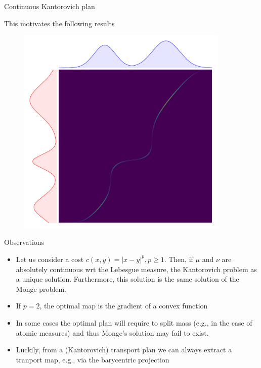 \documentclass[pdf,aspectratio=169,10pt]{beamer}
\begin{document}
\begin{frame}{ Continuous Kantorovich plan}
\begin{minipage}{0.59\textwidth}
        This motivates the following results
\end{minipage}
\hfill
\begin{minipage}{0.4\textwidth}
\begin{figure}
    \centering
        \includegraphics[width=0.9\textwidth]{../img/kantorovich_continuous_solution.pdf}
    \end{figure}
    \centering
    \small
{}
\end{minipage}
\end{frame}


\begin{frame}{Observations} 
    \begin{itemize}
        \item Let us consider a cost $c(x,y) = |x-y|^p, p\geq 1$. Then, if $\mu$ and $\nu$ are absolutely continuous wrt the Lebesgue measure, the Kantorovich problem as a unique solution. Furthermore, this solution is the same solution of the Monge problem.
        \item If $p=2$, the optimal map is the gradient of a convex function
        \item In some cases the optimal plan will require to split mass (e.g., in the case of atomic measures) and thus Monge's solution may fail to exist. 
        \item Luckily, from a (Kantorovich) transport plan we can always extract a tranport map, e.g., via the barycentric projection
    \end{itemize}
\end{frame}
\end{document}
